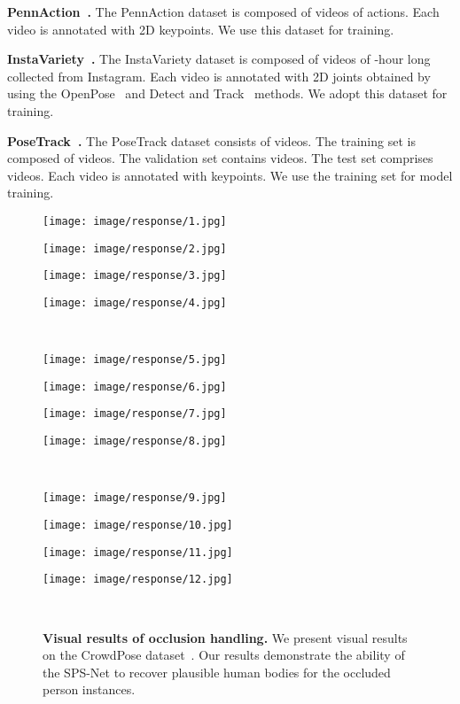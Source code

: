 \documentclass[times,referee,twocolumn,final,authoryear]{elsarticle}
\newcommand{\revised}[1]{{{#1}}}
\newcommand{\heading}[1]{\noindent\textbf{#1}}
\newcommand{\mpage}[2]
{
\begin{minipage}{#1\textwidth}\centering
#2
\end{minipage}
}
\begin{document}
\heading{PennAction~\citep{PennAction}.} 
The PennAction dataset is composed of  videos of  actions.
Each video is annotated with 2D keypoints.
We use this dataset for training.

\heading{InstaVariety~\citep{TemporalHMR}.}
The InstaVariety dataset is composed of videos of -hour long collected from Instagram.
Each video is annotated with 2D joints obtained by using the OpenPose~\citep{OpenPose} and Detect and Track~\citep{girdhar2018detect} methods.
We adopt this dataset for training.

\heading{PoseTrack~\citep{PoseTrack}.} 
The PoseTrack dataset consists of  videos.
The training set is composed of  videos.
The validation set contains  videos.
The test set comprises  videos.
Each video is annotated with  keypoints.
We use the training set for model training.

\begin{figure*}[t]
  \begin{center}
  \mpage{0.23}{\texttt{[image: image/response/1.jpg]}} \hfill
  \mpage{0.23}{\texttt{[image: image/response/2.jpg]}} \hfill
  \mpage{0.23}{\texttt{[image: image/response/3.jpg]}} \hfill
  \mpage{0.23}{\texttt{[image: image/response/4.jpg]}} \\
\vspace{2.0mm}
  \mpage{0.23}{\texttt{[image: image/response/5.jpg]}} \hfill
  \mpage{0.23}{\texttt{[image: image/response/6.jpg]}} \hfill
  \mpage{0.23}{\texttt{[image: image/response/7.jpg]}} \hfill
  \mpage{0.23}{\texttt{[image: image/response/8.jpg]}} \\
\vspace{2.0mm}
  \mpage{0.23}{\texttt{[image: image/response/9.jpg]}} \hfill
  \mpage{0.23}{\texttt{[image: image/response/10.jpg]}} \hfill
  \mpage{0.23}{\texttt{[image: image/response/11.jpg]}} \hfill
  \mpage{0.23}{\texttt{[image: image/response/12.jpg]}} \\
\vspace{-1.5mm}
  \caption{
  \textbf{Visual results of occlusion handling.} 
\revised{
  We present visual results on the CrowdPose dataset~\citep{li2019crowdpose}.
Our results demonstrate the ability of the SPS-Net to recover plausible human bodies for the occluded person instances.
}
}
  \label{fig:occlusion}
  \end{center}
  \vspace{-8.0mm}
\end{figure*}
\end{document}
